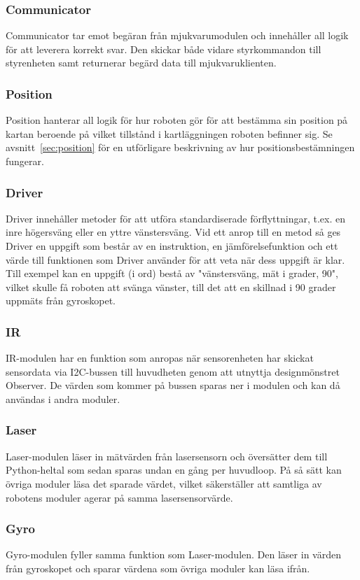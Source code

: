 \documentclass{article}
\begin{document}
\subsubsection{Communicator}
Communicator tar emot begäran från mjukvarumodulen och innehåller all logik för att leverera korrekt svar. Den skickar både vidare styrkommandon till styrenheten samt returnerar begärd data till mjukvaruklienten. 

\subsubsection{Position}
Position hanterar all logik för hur roboten gör för att bestämma sin position på kartan beroende på vilket tillstånd i kartläggningen roboten befinner sig. Se avsnitt~\ref{sec:position} för en utförligare beskrivning av hur positionsbestämningen fungerar. 

\subsubsection{Driver}
Driver innehåller metoder för att utföra standardiserade förflyttningar, t.ex. en inre högersväng eller en yttre vänstersväng. Vid ett anrop till en metod så ges Driver en uppgift som består av en instruktion, en jämförelsefunktion och ett värde till funktionen som Driver använder för att veta när dess uppgift är klar. Till exempel kan en uppgift (i ord) bestå av "vänstersväng, mät i grader, 90", vilket skulle få roboten att svänga vänster, till det att en skillnad i 90 grader uppmäts från gyroskopet. 

\subsubsection{IR}
IR-modulen har en funktion som anropas när sensorenheten har skickat sensordata via I2C-bussen till huvudheten genom att utnyttja designmönstret Observer. De värden som kommer på bussen sparas ner i modulen och kan då användas i andra moduler.
\subsubsection{Laser}
Laser-modulen läser in mätvärden från lasersensorn och översätter dem till Python-heltal som sedan sparas undan en gång per huvudloop. På så sätt kan övriga moduler läsa det sparade värdet, vilket säkerställer att samtliga av robotens moduler agerar på samma lasersensorvärde.

\subsubsection{Gyro}
Gyro-modulen fyller samma funktion som Laser-modulen. Den läser in värden från gyroskopet och sparar värdena som övriga moduler kan läsa ifrån.
\end{document}
